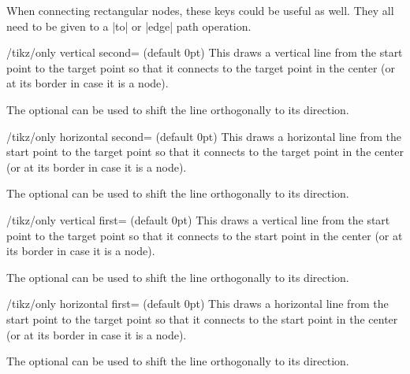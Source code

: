 When connecting rectangular nodes, these keys could be useful as well.
They all need to be given to a |to| or |edge| path operation.
\begin{stylekey}{/tikz/only vertical second= (default 0pt)}
This draws a vertical line from the start point to the target point so that
it connects to the target point in the center (or at its border in case it is a node).

The optional  can be used to shift the line orthogonally to its direction.
\end{stylekey}
\begin{stylekey}{/tikz/only horizontal second= (default 0pt)}
This draws a horizontal line from the start point to the target point so that
it connects to the target point in the center (or at its border in case it is a node).

The optional  can be used to shift the line orthogonally to its direction.
\end{stylekey}
\begin{stylekey}{/tikz/only vertical first= (default 0pt)}
This draws a vertical line from the start point to the target point so that
it connects to the start point in the center (or at its border in case it is a node).

The optional  can be used to shift the line orthogonally to its direction.
\end{stylekey}
\begin{stylekey}{/tikz/only horizontal first= (default 0pt)}
This draws a horizontal line from the start point to the target point so that
it connects to the start point in the center (or at its border in case it is a node).

The optional  can be used to shift the line orthogonally to its direction.
\end{stylekey}
